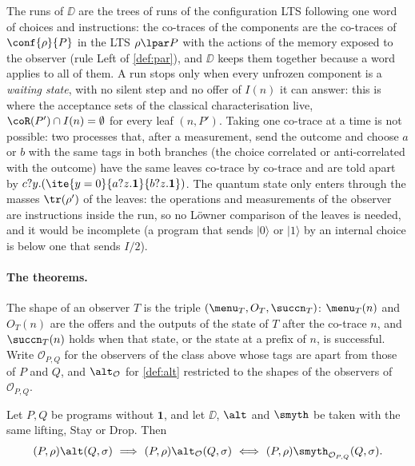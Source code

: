 The runs of $\DD$ are the trees of runs of the configuration LTS following
one word of choices and instructions: the co-traces of the components are
the co-traces of $\conf{\rho}{P}$ in the LTS $\rho \lpar P$ with the actions
of the memory exposed to the observer (rule Left of \cref{def:par}), and
$\DD$ keeps them together because a word applies to all of them. A run
stops only when every unfrozen component is a \emph{waiting state}, with no
silent step and no offer of $I(n)$ it can answer: this is where the
acceptance sets of the classical characterisation live, $\coR(P') \cap I(n)
= \emptyset$ for every leaf $(n, P')$. Taking one co-trace at a time is not
possible: two processes that, after a measurement, send the outcome and
choose $a$ or $b$ with the same tags in both branches (the choice correlated
or anti-correlated with the outcome) have the same leaves co-trace by
co-trace and are told apart by $c?y.(\ite{y=0}{a?z.\mathbf{1}}{b?z.\mathbf{1}})$.
The quantum state only enters through the masses $\tr(\rho')$ of the leaves:
the operations and measurements of the observer are instructions inside the
run, so no Löwner comparison of the leaves is needed, and it would be
incomplete (a program that sends $|0\rangle$ or $|1\rangle$ by an internal
choice is below one that sends $I/2$).

\paragraph{The theorems.} The shape of an observer $T$ is the triple
$(\menu_T, O_T, \succn_T)$: $\menu_T(n)$ and $O_T(n)$ are the offers and
the outputs of the state of $T$ after the co-trace $n$, and $\succn_T(n)$
holds when that state, or the state at a prefix of $n$, is successful. Write $\mathcal{O}_{P,Q}$ for the
observers of the class above whose tags are apart from those of $P$ and
$Q$, and $\alt_{\mathcal{O}}$ for \cref{def:alt} restricted to the shapes of
the observers of $\mathcal{O}_{P,Q}$.

\begin{theorem}\label{thm:char}
Let $P, Q$ be programs without $\mathbf{1}$, and let $\DD$, $\alt$ and
$\smyth$ be taken with the same lifting, Stay or Drop. Then
\[
(P,\rho) \alt (Q,\sigma)
\ \Longrightarrow\
(P,\rho) \alt_{\mathcal{O}} (Q,\sigma)
\ \Longleftrightarrow\
(P,\rho) {\smyth}_{\mathcal{O}_{P,Q}} (Q,\sigma).
\]
\end{theorem}

